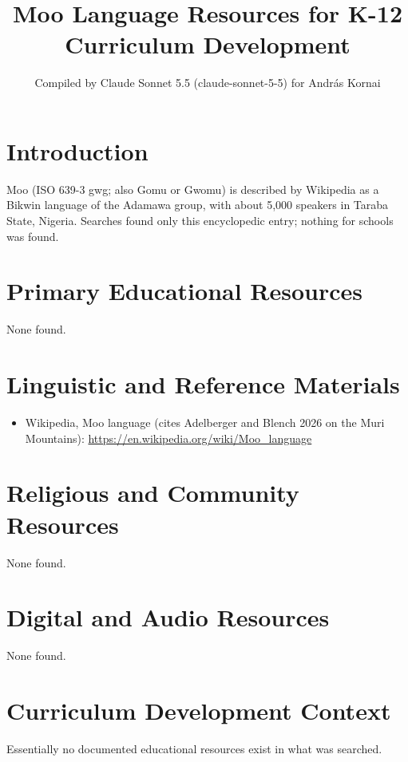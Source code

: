 \documentclass[12pt]{article}
\title{Moo Language Resources for K-12 Curriculum Development}
\author{Compiled by Claude Sonnet 5.5 (claude-sonnet-5-5) for Andr\'as Kornai}
\date{}
\begin{document}
\maketitle

\section{Introduction}
Moo (ISO 639-3 gwg; also Gomu or Gwomu) is described by Wikipedia as a Bikwin language of the Adamawa group, with about 5,000 speakers in Taraba State, Nigeria. Searches found only this encyclopedic entry; nothing for schools was found.

\section{Primary Educational Resources}
None found.

\section{Linguistic and Reference Materials}
\begin{itemize}
\item Wikipedia, Moo language (cites Adelberger and Blench 2026 on the Muri Mountains): \url{https://en.wikipedia.org/wiki/Moo_language}
\end{itemize}

\section{Religious and Community Resources}
None found.

\section{Digital and Audio Resources}
None found.

\section{Curriculum Development Context}
Essentially no documented educational resources exist in what was searched.
\end{document}
